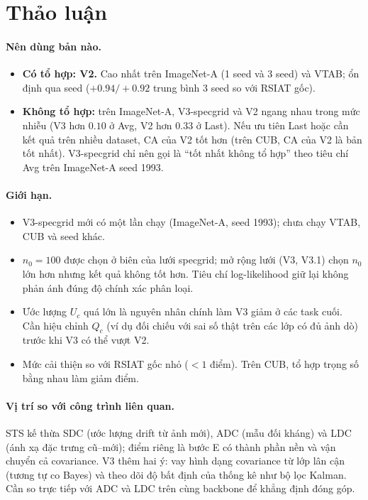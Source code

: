 \documentclass[11pt]{article}
\begin{document}
\section{Thảo luận}\label{sec:discussion}

\paragraph{Nên dùng bản nào.}
\begin{itemize}
\item \textbf{Có tổ hợp: V2.} Cao nhất trên ImageNet-A (1 seed và 3 seed) và VTAB; ổn định qua seed ($+0.94/+0.92$ trung
      bình 3 seed so với RSIAT gốc).
\item \textbf{Không tổ hợp:} trên ImageNet-A, V3-specgrid và V2 ngang nhau trong mức nhiễu (V3 hơn $0.10$ ở Avg, V2 hơn
      $0.33$ ở Last). Nếu ưu tiên Last hoặc cần kết quả trên nhiều dataset, CA của V2 tốt hơn (trên CUB, CA của V2 là bản
      tốt nhất). V3-specgrid chỉ nên gọi là ``tốt nhất không tổ hợp'' theo tiêu chí Avg trên ImageNet-A seed 1993.
\end{itemize}

\paragraph{Giới hạn.}\label{sec:limits}
\begin{itemize}
\item V3-specgrid mới có một lần chạy (ImageNet-A, seed 1993); chưa chạy VTAB, CUB và seed khác.
\item $n_0=100$ được chọn ở biên của lưới specgrid; mở rộng lưới (V3, V3.1) chọn $n_0$ lớn hơn nhưng kết quả không tốt
      hơn. Tiêu chí log-likelihood giữ lại không phản ánh đúng độ chính xác phân loại.
\item Ước lượng $U_c$ quá lớn là nguyên nhân chính làm V3 giảm ở các task cuối. Cần hiệu chỉnh $Q_c$ (ví dụ đối chiếu với
      sai số thật trên các lớp có đủ ảnh dò) trước khi V3 có thể vượt V2.
\item Mức cải thiện so với RSIAT gốc nhỏ ($<1$ điểm). Trên CUB, tổ hợp trọng số bằng nhau làm giảm điểm.
\end{itemize}

\paragraph{Vị trí so với công trình liên quan.} STS kế thừa SDC \cite{sdc} (ước lượng drift từ ảnh mới), ADC \cite{adc}
(mẫu đối kháng) và LDC \cite{ldc} (ánh xạ đặc trưng cũ--mới); điểm riêng là bước E có thành phần nền và vận chuyển cả
covariance. V3 thêm hai ý: vay hình dạng covariance từ lớp lân cận (tương tự co Bayes) và theo dõi độ bất định của thống
kê như bộ lọc Kalman. Cần so trực tiếp với ADC và LDC trên cùng backbone để khẳng định đóng góp.
\end{document}
